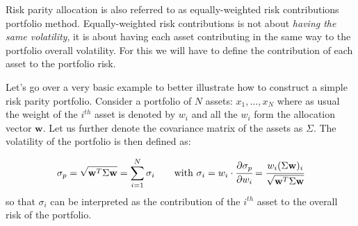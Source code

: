 Risk parity allocation is also referred to as equally-weighted risk contributions portfolio method. Equally-weighted risk contributions is not about \emph{having the same volatility}, it is about having each asset contributing in the same way to the portfolio overall volatility. For this we will have to define the contribution of each asset to the portfolio risk.

Let's go over a very basic example to better illustrate how to construct a simple risk parity portfolio. Consider a portfolio of \(N\) assets: \(x_{1}, \ldots, x_N\) where as usual the weight of the $i^{th}$ asset is denoted by \(w_{i}\) and all the \(w_{i}\) form the allocation vector \(\mathbf{w}\). Let us further denote the covariance matrix of the assets as \(\Sigma\). The volatility of the portfolio is then defined as:

\begin{equation}
\sigma_p={\sqrt {\mathbf{w}^T\Sigma \mathbf{w}}} = \sum_{i=1}^{N}\sigma _{i}\qquad\textrm{with}~\sigma _{i} = w_{i}\cdot \cfrac{\partial\sigma_p}{\partial w_{i}}={\cfrac {w_{i}(\Sigma \mathbf{w})_{i}}{\sqrt {\mathbf{w}^T\Sigma \mathbf{w}}}}
\end{equation}
so that \(\sigma _{i}\) can be interpreted as the contribution of the $i^{th}$ asset to the overall risk of the portfolio.

